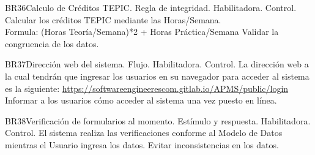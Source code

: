  \begin{BussinesRule}{BR36}{Calculo de Créditos TEPIC.}
     \BRitem[Tipo:] Regla de integridad.
     \BRitem[Clase:] Habilitadora.
     \BRitem[Nivel:] Control.
     \BRitem[Descripción:]Calcular los créditos TEPIC mediante las Horas/Semana.\\
     Formula: (Horas Teoría/Semana)*2 + Horas Práctica/Semana
     \BRitem[Motivación:] Validar la congruencia de los datos.
  \end{BussinesRule}
   \begin{BussinesRule}{BR37}{Dirección web del sistema.}
     \BRitem[Tipo:] Flujo.
     \BRitem[Clase:] Habilitadora.
     \BRitem[Nivel:] Control.
     \BRitem[Descripción:] La dirección web a la cual tendrán que ingresar los usuarios en su navegador para acceder al sistema es la siguiente: \url{https://softwareengineerescom.gitlab.io/APMS/public/login}
     \BRitem[Motivación:] Informar a los usuarios cómo acceder al sistema una vez puesto en línea.
  \end{BussinesRule}
   \begin{BussinesRule}{BR38}{Verificación de formularios al momento.}
     \BRitem[Tipo:]  Estímulo y respuesta.
     \BRitem[Clase:] Habilitadora.
     \BRitem[Nivel:] Control.
     \BRitem[Descripción:] El sistema realiza las verificaciones conforme al Modelo de Datos mientras el Usuario ingresa los datos.
     \BRitem[Motivación:] Evitar inconsistencias en los datos.
  \end{BussinesRule}

